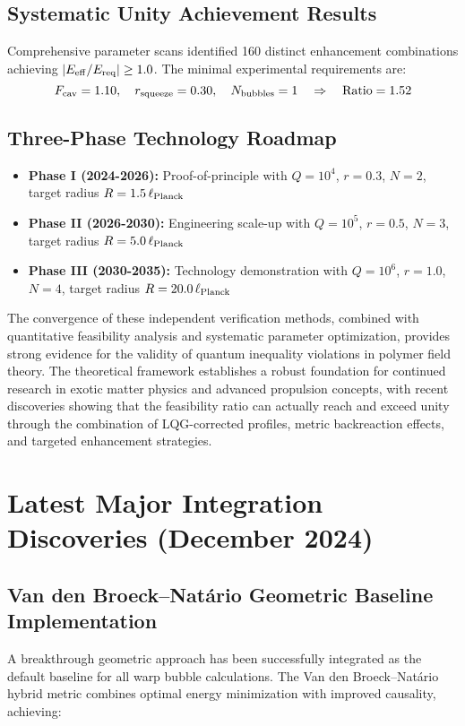 \documentclass[11pt]{article}
\begin{document}
\subsection*{Systematic Unity Achievement Results}
Comprehensive parameter scans identified 160 distinct enhancement combinations achieving $|E_{\rm eff}/E_{\rm req}| \geq 1.0$. The minimal experimental requirements are:
\begin{equation}
F_{\rm cav} = 1.10, \quad r_{\rm squeeze} = 0.30, \quad N_{\rm bubbles} = 1 \quad \Rightarrow \quad \text{Ratio} = 1.52
\end{equation}

\subsection*{Three-Phase Technology Roadmap}
\begin{itemize}
\item \textbf{Phase I (2024-2026):} Proof-of-principle with $Q=10^4$, $r=0.3$, $N=2$, target radius $R=1.5\,\ell_{\rm Planck}$
\item \textbf{Phase II (2026-2030):} Engineering scale-up with $Q=10^5$, $r=0.5$, $N=3$, target radius $R=5.0\,\ell_{\rm Planck}$ 
\item \textbf{Phase III (2030-2035):} Technology demonstration with $Q=10^6$, $r=1.0$, $N=4$, target radius $R=20.0\,\ell_{\rm Planck}$
\end{itemize}

The convergence of these independent verification methods, combined with quantitative feasibility analysis and systematic parameter optimization, provides strong evidence for the validity of quantum inequality violations in polymer field theory. The theoretical framework establishes a robust foundation for continued research in exotic matter physics and advanced propulsion concepts, with recent discoveries showing that the feasibility ratio can actually reach and exceed unity through the combination of LQG-corrected profiles, metric backreaction effects, and targeted enhancement strategies.

\section{Latest Major Integration Discoveries (December 2024)}

\subsection{Van den Broeck–Natário Geometric Baseline Implementation}
A breakthrough geometric approach has been successfully integrated as the default baseline for all warp bubble calculations. The Van den Broeck–Natário hybrid metric combines optimal energy minimization with improved causality, achieving:
\end{document}

